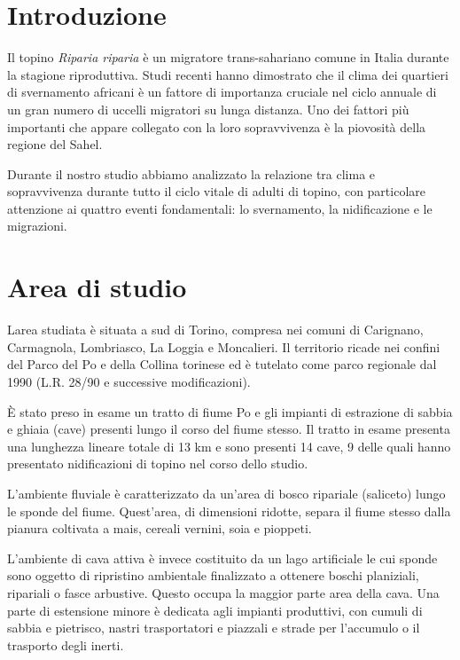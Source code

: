 \section*{Introduzione}

 Il topino \textit{Riparia riparia} \`e un migratore trans-sahariano
comune in Italia durante la stagione riproduttiva. Studi recenti hanno
dimostrato che il clima dei quartieri di svernamento africani \`e un
fattore di importanza cruciale nel ciclo annuale di un gran numero di
uccelli migratori su lunga distanza. Uno dei fattori pi\`u importanti
che appare collegato con la loro sopravvivenza \`e la piovosit\`a della
regione del Sahel. 

Durante il nostro studio abbiamo analizzato la relazione tra clima e
sopravvivenza durante tutto il ciclo vitale di adulti di topino, con
particolare attenzione ai quattro eventi fondamentali: lo svernamento,
la nidificazione e le migrazioni.

\section*{Area di studio}

L{\textquotesingle}area studiata \`e situata a sud di Torino, compresa
nei comuni di Carignano, Carmagnola, Lombriasco, La Loggia e
Moncalieri. Il territorio ricade nei confini del Parco del Po e della
Collina torinese ed \`e tutelato come parco regionale dal 1990 (L.R.
28/90 e successive modificazioni). 

\`E stato preso in esame un tratto di fiume Po e gli impianti di
estrazione di sabbia e ghiaia (cave) presenti lungo il corso del fiume
stesso. Il tratto in esame presenta una lunghezza lineare totale di 13
km e sono presenti 14 cave, 9 delle quali hanno presentato
nidificazioni di topino nel corso dello studio.

L{\textquoteright}ambiente fluviale \`e caratterizzato da
un{\textquoteright}area di bosco ripariale (saliceto) lungo le sponde
del fiume. Quest{\textquoteright}area, di dimensioni ridotte, separa il
fiume stesso dalla pianura coltivata a mais, cereali vernini, soia e
pioppeti.

L{\textquoteright}ambiente di cava attiva \`e invece costituito da un
lago artificiale le cui sponde sono oggetto di ripristino ambientale
finalizzato a ottenere boschi planiziali, ripariali o fasce arbustive.
Questo occupa la maggior parte area della cava. Una parte di estensione
minore \`e dedicata agli impianti produttivi, con cumuli di sabbia e
pietrisco, nastri trasportatori e piazzali e strade per
l{\textquoteright}accumulo o il trasporto degli inerti.

